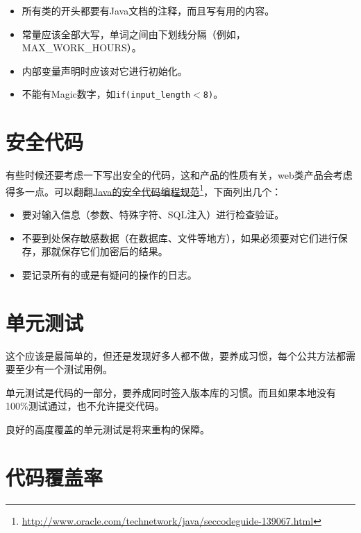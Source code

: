 \begin{itemize}
\item 所有类的开头都要有Java文档的注释，而且写有用的内容。

\item 常量应该全部大写，单词之间由下划线分隔（例如，MAX\_WORK\_HOURS）。

\item 内部变量声明时应该对它进行初始化。

\item 不能有Magic数字，如\texttt{if(input\_length$<$8)}。

\end{itemize}

\section{安全代码}
\label{安全代码}

有些时候还要考虑一下写出安全的代码，这和产品的性质有关，web类产品会考虑得多一点。可以翻翻\href{http://www.oracle.com/technetwork/java/seccodeguide-139067.html}{Java的安全代码编程规范}\footnote{\href{http://www.oracle.com/technetwork/java/seccodeguide-139067.html}{http:/\slash www.oracle.com\slash technetwork\slash java\slash seccodeguide-139067.html}}，下面列出几个：

\begin{itemize}
\item 要对输入信息（参数、特殊字符、SQL注入）进行检查验证。

\item 不要到处保存敏感数据（在数据库、文件等地方），如果必须要对它们进行保存，那就保存它们加密后的结果。

\item 要记录所有的或是有疑问的操作的日志。

\end{itemize}

\section{单元测试}
\label{单元测试}

这个应该是最简单的，但还是发现好多人都不做，要养成习惯，每个公共方法都需要至少有一个测试用例。

单元测试是代码的一部分，要养成同时签入版本库的习惯。而且如果本地没有100\%测试通过，也不允许提交代码。

良好的高度覆盖的单元测试是将来重构的保障。

\section{代码覆盖率}
\label{代码覆盖率}

